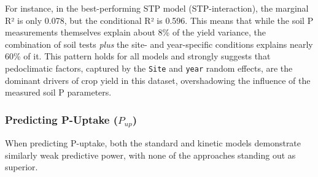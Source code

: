 \documentclass[
  a4paper,
]{article}
\begin{document}
For instance, in the best-performing STP model (STP-interaction), the
marginal R² is only 0.078, but the conditional R² is 0.596. This means
that while the soil P measurements themselves explain about 8\% of the
yield variance, the combination of soil tests \emph{plus} the site- and
year-specific conditions explains nearly 60\% of it. This pattern holds
for all models and strongly suggests that pedoclimatic factors, captured
by the \texttt{Site} and \texttt{year} random effects, are the dominant
drivers of crop yield in this dataset, overshadowing the influence of
the measured soil P parameters.

\subsubsection{\texorpdfstring{Predicting P-Uptake
(\(P_{up}\))}{Predicting P-Uptake (P\_\{up\})}}\label{predicting-p-uptake-p_up}

When predicting P-uptake, both the standard and kinetic models
demonstrate similarly weak predictive power, with none of the approaches
standing out as superior.
\end{document}
